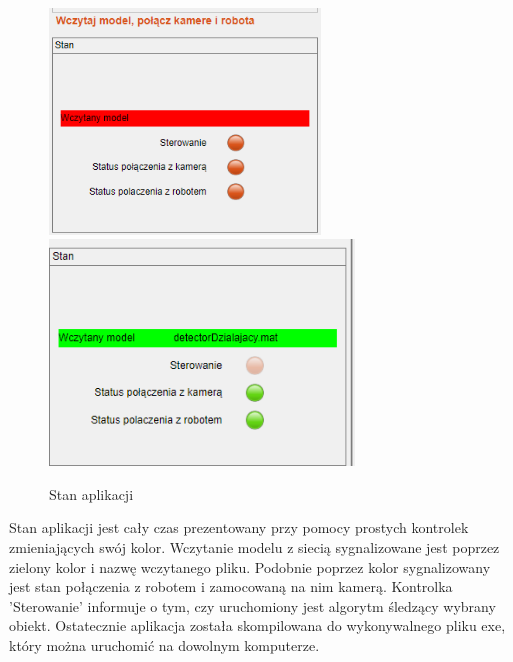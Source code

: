 \begin{figure}[H]
	\centering
	\includegraphics[height=6cm]{pages/siecIRobot/zdjecia/program/programStanErr.png}
	\includegraphics[height=6cm]{pages/siecIRobot/zdjecia/program/programStan.png}
	\caption{Stan aplikacji}
\end{figure}
Stan aplikacji jest cały czas prezentowany przy pomocy prostych kontrolek zmieniających swój kolor. 
Wczytanie modelu z siecią sygnalizowane jest poprzez zielony kolor i nazwę wczytanego pliku. 
Podobnie poprzez kolor sygnalizowany jest stan połączenia z robotem i zamocowaną na nim kamerą.
Kontrolka 'Sterowanie' informuje o tym, czy uruchomiony jest algorytm śledzący wybrany obiekt. 
Ostatecznie aplikacja została skompilowana do wykonywalnego pliku exe, który można uruchomić na dowolnym komputerze.
